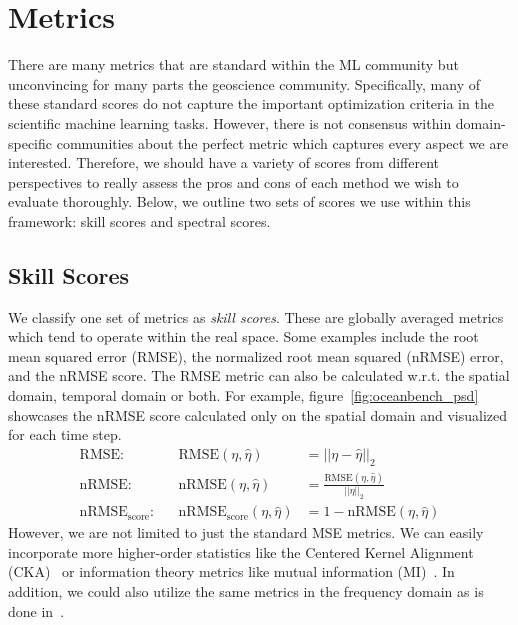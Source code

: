 \section{Metrics} \label{sec:metrics}

There are many metrics that are standard within the ML community but unconvincing for many parts the geoscience community. 
Specifically, many of these standard scores do not capture the important optimization criteria in the scientific machine learning tasks.
However, there is not consensus within domain-specific communities about the perfect metric which captures every aspect we are interested.
Therefore, we should have a variety of scores from different perspectives to really assess the pros and cons of each method we wish to evaluate thoroughly. 
Below, we outline two sets of scores we use within this framework: skill scores and spectral scores.

\subsection{Skill Scores}

We classify one set of metrics as \textit{skill scores}. 
These are globally averaged metrics which tend to operate within the real space.
Some examples include the root mean squared error (RMSE), the normalized root mean squared (nRMSE) error, and the nRMSE score.
The RMSE metric can also be calculated w.r.t. the spatial domain, temporal domain or both. 
For example, figure~\ref{fig:oceanbench_psd} showcases the nRMSE score calculated only on the spatial domain and visualized for each time step.
%
\begin{align}
    \text{RMSE}: &&\text{RMSE}(\eta,\hat{\eta}) &= ||\eta - \hat{\eta}||_2 \label{eq:RMSE}\\
    \text{nRMSE}: &&\text{nRMSE}(\eta,\hat{\eta}) &= \frac{\text{RMSE}(\eta,\hat{\eta})}{||\eta||_2} \label{eq:nRMSE} \\
    \text{nRMSE}_{\text{score}}: &&\text{nRMSE}_{\text{score}}(\eta,\hat{\eta}) &= 1 - \text{nRMSE}(\eta,\hat{\eta})
    \label{eq:nRMSE_score}
\end{align}
%
However, we are not limited to just the standard MSE metrics.
We can easily incorporate more higher-order statistics like the Centered Kernel Alignment (CKA)~\cite{METRICSCKA} or information theory metrics like mutual information (MI)~\cite{METRICSITRBIG,METRICSITRBIG2}.
In addition, we could also utilize the same metrics in the frequency domain as is done in~\citep{PDEBench}.

